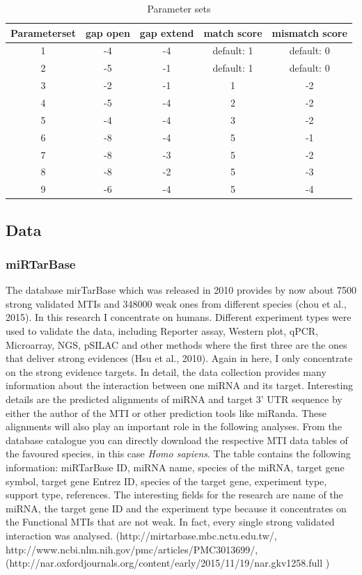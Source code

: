 \documentclass[12pt]{article}
\begin{document}
\begin{table}
\label{table:parameter}
\caption{Parameter sets}
\vspace{0.3cm}
\begin{tabular}{c|c|c|c|c}
Parameterset & gap open & gap extend & match score & mismatch score\\
\hline\hline 
1 & -4 & -4 & default: 1 & default: 0\\
2 & -5 & -1 & default: 1 & default: 0\\
3 & -2 & -1 & 1 & -2 \\
4 & -5 & -4 & 2 & -2 \\
5 & -4 & -4 & 3 & -2 \\
6 & -8 & -4 & 5 & -1 \\
7 & -8 & -3 & 5 & -2 \\
8 & -8 & -2 & 5 & -3 \\
9 & -6 & -4 & 5 & -4 \\
\hline
\end{tabular}
\end{table}

 
\subsection{Data} 
\subsubsection{miRTarBase}
The database mirTarBase which was released in 2010 provides by now about 7500 strong validated MTIs and 348000 weak ones from different species (chou et al., 2015). In this research I concentrate on humans. Different experiment types were used to validate the data, including Reporter assay, Western plot, qPCR, Microarray, NGS, pSILAC and other methods where the first three are the ones that deliver strong evidences (Hsu et al., 2010). Again in here, I only concentrate on the strong evidence targets. In detail, the data collection provides many information about the interaction between one miRNA and its target. Interesting details are the predicted alignments of miRNA and target 3' UTR sequence by either the author of the MTI or other prediction tools like miRanda. These alignments will also play an important role in the following analyses. From the database catalogue you can directly download the respective MTI data tables of the favoured species, in this case \textit{Homo sapiens}. The table contains the following information: miRTarBase ID, miRNA name, species of the miRNA, target gene symbol, target gene Entrez ID, species of the target gene, experiment type, support type, references. The interesting fields for the research are name of the miRNA, the target gene ID and the experiment type because it concentrates on the Functional MTIs that are not weak. In fact, every single strong validated interaction was analysed. (http://mirtarbase.mbc.nctu.edu.tw/, http://www.ncbi.nlm.nih.gov/pmc/articles/PMC3013699/, (http://nar.oxfordjournals.org/content/early/2015/11/19/nar.gkv1258.full )
\end{document}
